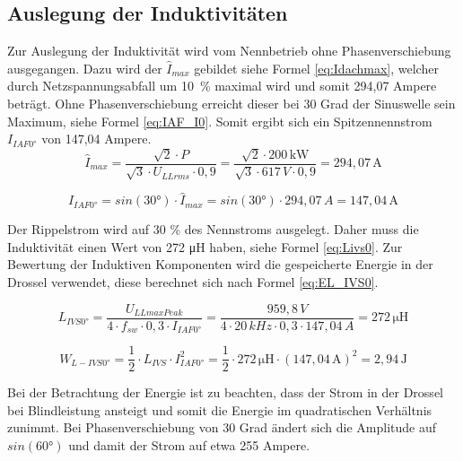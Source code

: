 	\subsection{Auslegung der Induktivitäten}
	Zur Auslegung der Induktivität wird vom Nennbetrieb ohne Phasenverschiebung ausgegangen. Dazu wird der $\hat{I}_{max}$ gebildet siehe Formel \ref{eq:Idachmax}, welcher durch Netzspannungsabfall um 10~\% maximal wird und somit 294,07 Ampere beträgt. Ohne Phasenverschiebung erreicht dieser bei 30 Grad der Sinuswelle sein Maximum, siehe Formel \ref{eq:IAF_I0}. Somit ergibt sich ein Spitzennennstrom $I_{IAF0°}$ von 147,04 Ampere.
	\begin{equation}
		\label{eq:Idachmax}
		\hat{I}_{max} = \dfrac{\sqrt{2} \cdot P   }{ \sqrt{3}  \cdot  U_{LLrms} \cdot 0,9} = \dfrac{\sqrt{2} \cdot 200\, \si{\kilo \watt}} { \sqrt{3} \cdot 617\, \si{V} \cdot 0,9} = 294,07\, \si{\A}
	\end{equation}
	
	\begin{equation}
		\label{eq:IAF_I0}
		I_{IAF0°}= sin(30°)\cdot \hat{I}_{max}=sin(30°)\cdot 294,07 \,A = 147,04\, \si{\A}
	\end{equation}
	
	Der Rippelstrom wird auf 30 \% des Nennstroms ausgelegt. Daher muss die Induktivität einen Wert von 272 \si{\micro \henry} haben, siehe Formel \ref{eq:Livs0}. Zur Bewertung der Induktiven Komponenten wird die gespeicherte Energie in der Drossel verwendet, diese berechnet sich nach Formel \ref{eq:EL_IVS0}.
		
		\begin{equation}
			\label{eq:Livs0}
			L_{IVS0°}= \dfrac{U_{LLmaxPeak}}{4\cdot f_{sw} \cdot 0,3 \cdot I_{IAF0°}} = \dfrac{959,8\, V}{4 \cdot 20\, kHz \cdot 0,3 \cdot 147,04\, A}= 272\, \si{\micro \henry}
		\end{equation}
		
		\begin{equation}
			\label{eq:EL_IVS0}
			W_{L-IVS0°}=\dfrac{1}{2} \cdot L_{IVS} \cdot I_{IAF0°}^{2} = \dfrac{1}{2} \cdot 272\, \si{\micro \henry} \cdot (147,04\, \si{\A})^{2} =  2,94 \, \si{\joule}
		\end{equation}
		
		Bei der Betrachtung der Energie ist zu beachten, dass der Strom in der Drossel bei Blindleistung ansteigt und somit die Energie im quadratischen Verhältnis zunimmt. Bei Phasenverschiebung von 30 Grad ändert sich die Amplitude auf $sin(60°)$ und damit der Strom auf etwa 255 Ampere.
			
